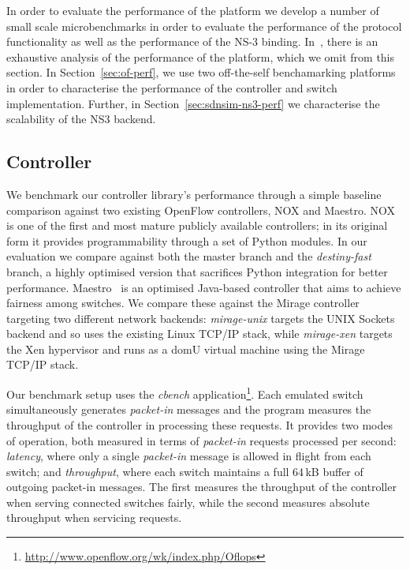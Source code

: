 In order to evaluate the performance of the \sdnsim platform we develop a number
of small scale microbenchmarks in order to evaluate the performance of the \of
protocol functionality as well as the performance of the NS-3 binding.
In~\cite{madhavapeddy2013}, there is an exhaustive analysis of the performance of the
\mirage platform, which we omit from this section. In Section~\ref{sec:of-perf},
we use two off-the-self \of benchamarking platforms in order to characterise the 
performance of the controller and switch implementation. Further, in
Section~\ref{sec:sdnsim-ns3-perf} we characterise the scalability of the NS3 
backend.


\subsection{\mirage Controller}

We benchmark our controller library's performance through a simple
baseline comparison against two existing OpenFlow controllers, NOX and
Maestro. NOX~\cite{nox} is one of the first and most mature publicly available
\of controllers; in its original form it provides programmability through
a set of Python modules. In our evaluation we compare against both the master
branch and the \emph{destiny-fast} branch, a highly optimised version that
sacrifices Python integration for better performance. Maestro~\cite{cai2011}
is an optimised Java-based controller that aims to achieve fairness among
switches. We compare these against the Mirage controller targeting two
different network backends: \emph{mirage-unix} targets the UNIX Sockets
backend and so uses the existing Linux TCP/IP stack, while \emph{mirage-xen}
targets the Xen hypervisor and runs as a domU virtual machine using the Mirage
TCP/IP stack.

Our benchmark setup uses the \emph{cbench}
application\footnote{\url{http://www.openflow.org/wk/index.php/Oflops}}. Each
emulated switch simultaneously generates \emph{packet-in} messages and the
program measures the throughput of the controller in processing these
requests. It provides two modes of operation, both measured in terms of
\emph{packet-in} requests processed per second: \emph{latency}, where only a single
\emph{packet-in} message is allowed in flight from each switch; and
\emph{throughput}, where each switch maintains a full 64\,kB buffer of
outgoing packet-in messages. The first measures the throughput of the
controller when serving connected switches fairly, while the second measures
absolute throughput when servicing requests.
                                                                       
